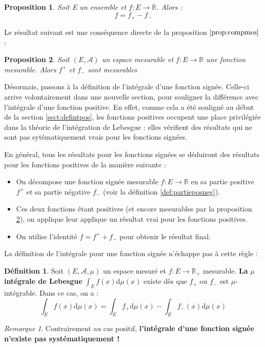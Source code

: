 \documentclass[french]{report}
\theoremstyle{plain}
\newtheorem{prop}{Proposition}[section]
\theoremstyle{definition}
\newtheorem{defi}{Définition}[section]
\theoremstyle{remark}
\newtheorem{rem}{Remarque}[section]
\newcommand\itemb{\item[$\bullet$]}
\begin{document}
\begin{prop}
  Soit E un ensemble et $f:E\longrightarrow\mathbb{R}$.
  Alors :
  $$
  f = f_+ - f_-
  $$
\end{prop}

Le résultat suivant est une conséquence directe de la proposition $\ref{prop:compmes}$ :

\begin{prop}
  \label{prop:partiemes}
  Soit $\left(E,\mathcal{A}\right)$ un espace mesurable et $f:E\longrightarrow\mathbb{R}$ une fonction mesurable.
  Alors $f^+$ et $f_-$ sont mesurables
\end{prop}

Désormais, passons à la définition de l'intégrale d'une fonction signée. Celle-ci arrive volontairement dans une nouvelle section, pour souligner la différence avec l'intégrale d'une fonction positive.
En effet, comme cela a été souligné au début de la section \ref{sect:defintpos}, les fonctions positives occupent une place privilégiée dans la théorie de l'intégration de Lebesgue : elles vérifient des résultats qui ne sont pas sytématiquement vrais pour les fonctions signées.

En général, tous les résultats pour les fonctions signées se déduiront des résultats pour les fonctions positives de la manière suivante :
\begin{itemize}
  \itemb On décompose une fonction signée mesurable $f:E\longrightarrow\mathbb{R}$ en sa partie positive $f^+$ et sa partie négative $f_-$ (voir la définition \ref{def:partieposneg}).
  \itemb Ces deux fonctions étant positives (et encore mesurables par la proposition \ref{prop:partiemes}), on applique leur applique un résultat vrai pour les fonctions positives.
  \itemb On utilise l'identité $f=f^++f_-$ pour obtenir le résultat final.
\end{itemize}

La définition de l'intégrale pour une fonction signée n'échappe pas à cette règle :

\begin{defi}
  Soit $\left(E,\mathcal{A},\mu\right)$ un espace mesuré et $f:E\rightarrow\mathbb{R}_+$ mesurable.
  \textbf{La} $\mu$ \textbf{intégrale de Lebesgue} $\displaystyle\int_E f(x) \text{d}\mu(x)$ existe dès que $f_+$ ou $f_-$ est $\mu$-intégrable.
  Dans ce cas, on a :
  $$
  \int_E f(x) \text{d}\mu(x)=\int_Ef_+\text{d}\mu(x) - \int_Ef_-(x)\text{d}\mu(x)
  $$
\end{defi}

\begin{rem}
  Contrairement au cas positif, \textbf{l'intégrale d'une fonction signée n'existe pas systématiquement !}
\end{rem}
\end{document}
